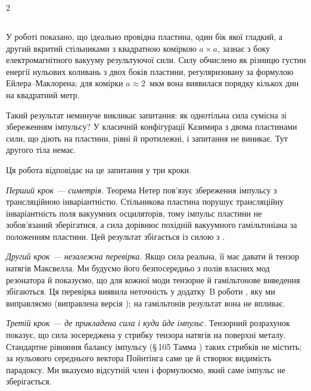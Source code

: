 \documentclass[twoside, 10pt]{article}
\def\myvspacebeforesubsection{-2.0mm}
\def\myvspaceaftersubsection{-2.5mm}
\begin{document}
\newpage

\begin{multicols}{2}

\vspace{\myvspacebeforesubsection}
\subsection*{}
\vspace{\myvspaceaftersubsection}


У роботі \cite{Drozdov2024} показано, що ідеально провідна пластина, один бік якої гладкий, а
другий вкритий стільниками з квадратною коміркою \(a\times a\), зазнає з боку електромагнітного
вакууму результуючої сили. Силу обчислено як різницю густин енергії нульових коливань з двох боків
пластини, регуляризовану за формулою Ейлера--Маклорена; для комірки \(a\approx2\)~мкм вона
виявилася порядку кількох дин на квадратний метр.

Такий результат неминуче викликає запитання: як однотільна сила сумісна зі збереженням імпульсу?
У класичній конфігурації Казимира з двома пластинами сили, що діють на пластини, рівні й
протилежні, і запитання не виникає. Тут другого тіла немає.

Ця робота відповідає на це запитання у три кроки.

\textit{Перший крок --- симетрія.} Теорема Нетер \cite{Noether1918} пов'язує збереження імпульсу
з трансляційною інваріантністю. Стільникова пластина порушує трансляційну інваріантність поля вакуумних осциляторів, тому імпульс пластини не зобов'язаний зберігатися, а сила дорівнює похідній вакуумного гамільтоніана за положенням
пластини. Цей результат збігається із силою з \cite{Drozdov2024}.

\textit{Другий крок --- незалежна перевірка.} Якщо сила реальна, її має давати й тензор натягів
Максвелла. Ми будуємо його безпосередньо з полів власних мод резонатора й показуємо, що для кожної
моди тензорне й гамільтонове виведення збігаються. Ця перевірка виявила неточність у додатку~B роботи \cite{Drozdov2024}, яку ми виправляємо (виправлена версія \cite{Drozdov2024fix}); на гамільтонів результат вона не впливає.

\textit{Третій крок --- де прикладена сила і куди йде імпульс.} Тензорний розрахунок показує, що
сила зосереджена у стрибку тензора натягів на поверхні металу. Стандартне рівняння балансу
імпульсу (\S\,105 Тамма \cite{Tamm1957}) таких стрибків не містить; за нульового середнього
вектора Пойнтінга саме це й створює видимість парадоксу. Ми вказуємо відсутній член і формулюємо,
який саме імпульс не зберігається.


\end{multicols}
\end{document}
